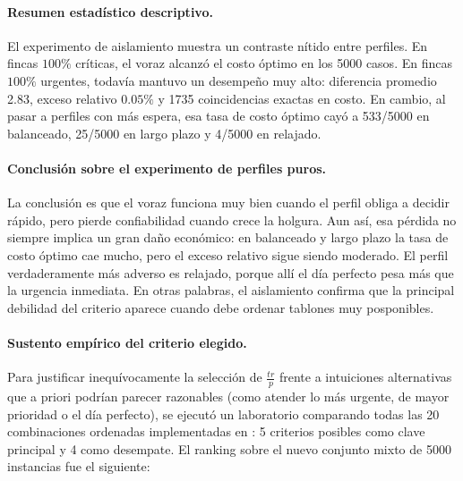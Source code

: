 \documentclass[12pt,a4paper]{article}
\begin{document}
\paragraph{Resumen estad\'istico descriptivo.}
El experimento de aislamiento muestra un contraste n\'itido entre perfiles. En fincas \(100\%\) cr\'iticas, el voraz alcanz\'o el costo \'optimo en los 5000 casos. En fincas \(100\%\) urgentes, todav\'ia mantuvo un desempe\~no muy alto: diferencia promedio 2.83, exceso relativo \(0.05\%\) y 1735 coincidencias exactas en costo. En cambio, al pasar a perfiles con m\'as espera, esa tasa de costo \'optimo cay\'o a 533/5000 en balanceado, 25/5000 en largo plazo y 4/5000 en relajado.

\paragraph{Conclusi\'on sobre el experimento de perfiles puros.}
La conclusi\'on es que el voraz funciona muy bien cuando el perfil obliga a decidir r\'apido, pero pierde confiabilidad cuando crece la holgura. Aun as\'i, esa p\'erdida no siempre implica un gran da\~no econ\'omico: en balanceado y largo plazo la tasa de costo \'optimo cae mucho, pero el exceso relativo sigue siendo moderado. El perfil verdaderamente m\'as adverso es relajado, porque all\'i el d\'ia perfecto pesa m\'as que la urgencia inmediata. En otras palabras, el aislamiento confirma que la principal debilidad del criterio aparece cuando debe ordenar tablones muy posponibles.

\paragraph{Sustento emp\'irico del criterio elegido.}
Para justificar inequ\'ivocamente la selecci\'on de \(\frac{tr}{p}\) frente a intuiciones alternativas que a priori podr\'ian parecer razonables (como atender lo m\'as urgente, de mayor prioridad o el d\'ia perfecto), se ejecut\'o un laboratorio comparando todas las 20 combinaciones ordenadas implementadas en : 5 criterios posibles como clave principal y 4 como desempate. El ranking sobre el nuevo conjunto mixto de 5000 instancias fue el siguiente:
\end{document}
